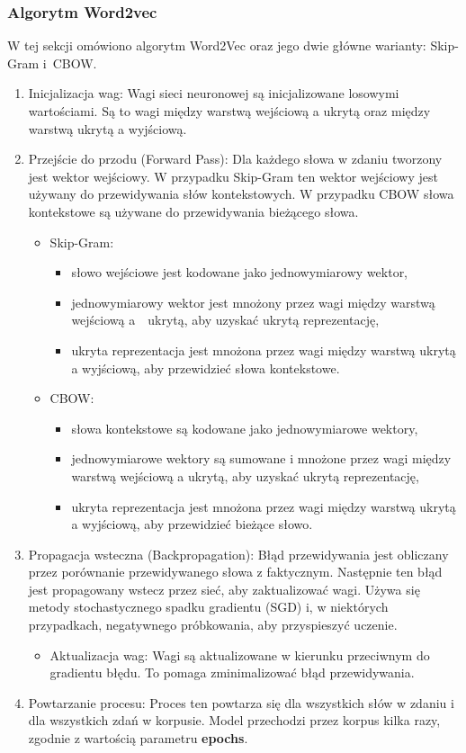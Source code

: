 		\subsubsection{Algorytm Word2vec}
			W tej sekcji omówiono algorytm Word2Vec oraz jego dwie główne warianty: Skip-Gram i~CBOW.
			\begin{enumerate}
				\item Inicjalizacja wag: Wagi sieci neuronowej są inicjalizowane losowymi wartościami. Są to wagi między warstwą wejściową a ukrytą oraz między warstwą ukrytą a wyjściową.
				\item Przejście do przodu (Forward Pass): Dla każdego słowa w zdaniu tworzony jest wektor wejściowy. W przypadku Skip-Gram ten wektor wejściowy jest używany do przewidywania słów kontekstowych. W przypadku CBOW słowa kontekstowe są używane do przewidywania bieżącego słowa.
				\begin{itemize}
					\item Skip-Gram:
					\begin{itemize}
						\item słowo wejściowe jest kodowane jako jednowymiarowy wektor,
						\item jednowymiarowy wektor jest mnożony przez wagi między warstwą wejściową a~~ukrytą, aby uzyskać ukrytą reprezentację,
						\item ukryta reprezentacja jest mnożona przez wagi między warstwą ukrytą a wyjściową, aby przewidzieć słowa kontekstowe.
					\end{itemize}
					\item CBOW:
					\begin{itemize}
						\item słowa kontekstowe są kodowane jako jednowymiarowe wektory,
						\item jednowymiarowe wektory są sumowane i mnożone przez wagi między warstwą wejściową a ukrytą, aby uzyskać ukrytą reprezentację,
						\item ukryta reprezentacja jest mnożona przez wagi między warstwą ukrytą a wyjściową, aby przewidzieć bieżące słowo.
					\end{itemize}								
				\end{itemize}
				\item Propagacja wsteczna (Backpropagation): Błąd przewidywania jest obliczany przez porównanie przewidywanego słowa z faktycznym. Następnie ten błąd jest propagowany wstecz przez sieć, aby zaktualizować wagi. Używa się metody stochastycznego spadku gradientu (SGD) i, w niektórych przypadkach, negatywnego próbkowania, aby przyspieszyć uczenie.
				\begin{itemize}
					\item Aktualizacja wag: Wagi są aktualizowane w kierunku przeciwnym do gradientu błędu. To pomaga zminimalizować błąd przewidywania.
				\end{itemize}
				\item Powtarzanie procesu: Proces ten powtarza się dla wszystkich słów w zdaniu i dla wszystkich zdań w korpusie. Model przechodzi przez korpus kilka razy, zgodnie z wartością parametru \textbf{epochs}.
			\end{enumerate}
	

